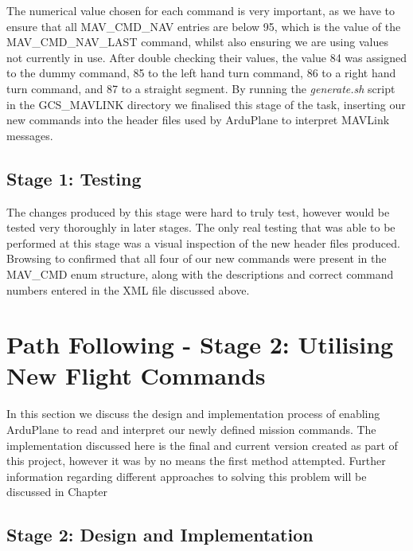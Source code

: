 The numerical value chosen for each command is very important, as we have to ensure that all MAV\_CMD\_NAV entries are below 95, which is the value of the MAV\_CMD\_NAV\_LAST command, whilst also ensuring we are using values not currently in use. After double checking their values, the value 84 was assigned to the dummy command, 85 to the left hand turn command, 86 to a right hand turn command, and 87 to a straight segment. By running the \textit{generate.sh} script in the GCS\_MAVLINK directory we finalised this stage of the task, inserting our new commands into the header files used by ArduPlane to interpret MAVLink messages.

\subsection{Stage 1: Testing}
\label{task2:stage1:testing}

The changes produced by this stage were hard to truly test, however would be tested very thoroughly in later stages. The only real testing that was able to be performed at this stage was a visual inspection of the new header files produced. Browsing to  confirmed that all four of our new commands were present in the MAV\_CMD enum structure, along with the descriptions and correct command numbers entered in the XML file discussed above. 

\section{Path Following - Stage 2: Utilising New Flight Commands}
\label{task2:stage2}

In this section we discuss the design and implementation process of enabling ArduPlane to read and interpret our newly defined mission commands. The implementation discussed here is the final and current version created as part of this project, however it was by no means the first method attempted. Further information regarding different approaches to solving this problem will be discussed in Chapter %

\subsection{Stage 2: Design and Implementation}
\label{task2:stage2:design}

